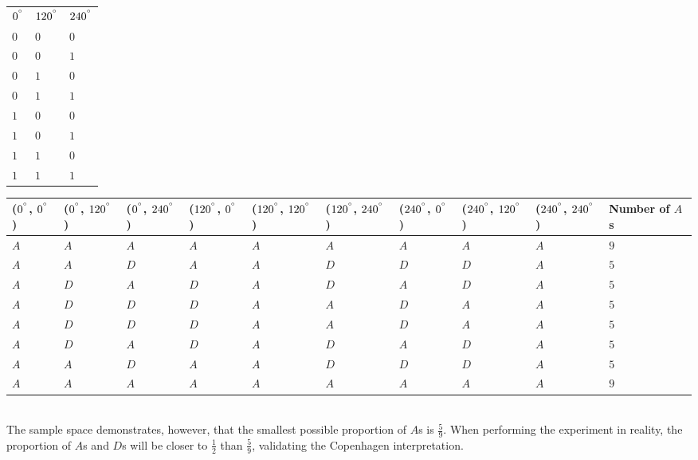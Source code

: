 \begin{definition}
    \begin{adjustbox}{width=\textwidth}
        \begin{tabular}{lll}
        $0^{\degree}$ & $120^{\degree}$ & $240^{\degree}$ \\
        $0$ & $0$ & $0$ \\
        $0$ & $0$ & $1$ \\
        $0$ & $1$ & $0$ \\
        $0$ & $1$ & $1$ \\
        $1$ & $0$ & $0$ \\
        $1$ & $0$ & $1$ \\
        $1$ & $1$ & $0$ \\
        $1$ & $1$ & $1$ \\
        \end{tabular}
        \begin{tabular}{|l|l|l|l|l|l|l|l|l|l|}
        \hline ($0^{\degree}$, $0^{\degree}$) & ($0^{\degree}$, $120^{\degree}$) & ($0^{\degree}$, $240^{\degree}$) & ($120^{\degree}$, $0^{\degree}$) & ($120^{\degree}$, $120^{\degree}$) & ($120^{\degree}$, $240^{\degree}$) & ($240^{\degree}$, $0^{\degree}$) & ($240^{\degree}$, $120^{\degree}$) & ($240^{\degree}$, $240^{\degree}$) & Number of $A$s \\
        \hline $A$ & $A$ & $A$ & $A$ & $A$ & $A$ & $A$ & $A$ & $A$ & $9$ \\
        \hline $A$ & $A$ & $D$ & $A$ & $A$ & $D$ & $D$ & $D$ & $A$ & $5$ \\
        \hline $A$ & $D$ & $A$ & $D$ & $A$ & $D$ & $A$ & $D$ & $A$ & $5$ \\
        \hline $A$ & $D$ & $D$ & $D$ & $A$ & $A$ & $D$ & $A$ & $A$ & $5$ \\
        \hline $A$ & $D$ & $D$ & $D$ & $A$ & $A$ & $D$ & $A$ & $A$ & $5$ \\
        \hline $A$ & $D$ & $A$ & $D$ & $A$ & $D$ & $A$ & $D$ & $A$ & $5$ \\
        \hline $A$ & $A$ & $D$ & $A$ & $A$ & $D$ & $D$ & $D$ & $A$ & $5$ \\
        \hline $A$ & $A$ & $A$ & $A$ & $A$ & $A$ & $A$ & $A$ & $A$ & $9$ \\
        \hline
        \end{tabular}
    \end{adjustbox}\\

    The sample space demonstrates, however, that the smallest possible proportion of $A$s is $\frac{5}{9}$. When performing the experiment in reality, the proportion of $A$s and $D$s will be closer to $\frac{1}{2}$ than $\frac{5}{9}$, validating the Copenhagen interpretation.
\end{definition}

